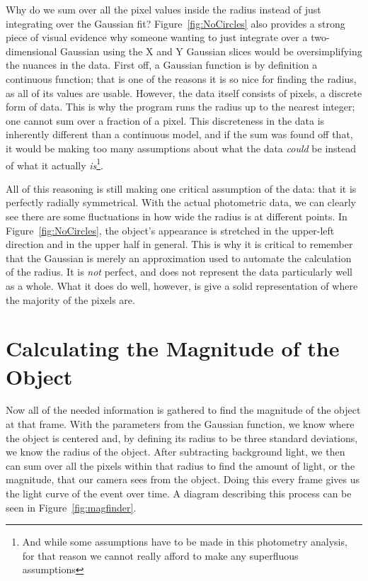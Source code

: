 Why do we sum over all the pixel values inside the radius instead of just integrating over the Gaussian fit? Figure~\ref{fig:NoCircles} also provides a strong piece of visual evidence why someone wanting to just integrate over a two-dimensional Gaussian using the X and Y Gaussian slices would be oversimplifying the nuances in the data. First off, a Gaussian function is by definition a continuous function; that is one of the reasons it is so nice for finding the radius, as all of its values are usable. However, the data itself consists of pixels, a discrete form of data. This is why the program runs the radius up to the nearest integer; one cannot sum over a fraction of a pixel. This discreteness in the data is inherently different than a continuous model, and if the sum was found off that, it would be making too many assumptions about what the data \textit{could} be instead of what it actually \textit{is}\footnote{And while some assumptions have to be made in this photometry analysis, for that reason we cannot really afford to make any superfluous assumptions}.

All of this reasoning is still making one critical assumption of the data: that it is perfectly radially symmetrical. With the actual photometric data, we can clearly see there are some fluctuations in how wide the radius is at different points. In Figure~\ref{fig:NoCircles}, the object's appearance is stretched in the upper-left direction and in the upper half in general. This is why it is critical to remember that the Gaussian is merely an approximation used to automate the calculation of the radius. It is \textit{not} perfect, and does not represent the data particularly well as a whole. What it does do well, however, is give a solid representation of where the majority of the pixels are.

\section{Calculating the Magnitude of the Object}

Now all of the needed information is gathered to find the magnitude of the object at that frame. With the parameters from the Gaussian function, we know where the object is centered and, by defining its radius to be three standard deviations, we know the radius of the object. After subtracting background light, we then can sum over all the pixels within that radius to find the amount of light, or the magnitude, that our camera sees from the object.  Doing this every frame gives us the light curve of the event over time. A diagram describing this process can be seen in Figure~\ref{fig:magfinder}.


